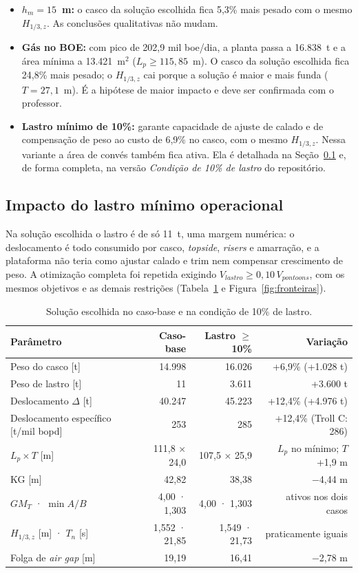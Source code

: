 \documentclass[11pt,a4paper]{article}
\newcommand{\Hz}{H_{1/3,z}}
\begin{document}
\begin{itemize}
\item \textbf{$h_m = 15$~m:} o casco da solução escolhida fica 5,3\% mais pesado com o mesmo
$\Hz$. As conclusões qualitativas não mudam.
\item \textbf{Gás no BOE:} com pico de 202,9 mil boe/dia, a planta passa a 16.838~t e a área
mínima a 13.421~m$^2$ ($L_p \ge 115{,}85$~m). O casco da solução escolhida fica 24,8\% mais
pesado; o $\Hz$ cai porque a solução é maior e mais funda ($T = 27{,}1$~m). É a hipótese de maior
impacto e deve ser confirmada com o professor.
\item \textbf{Lastro mínimo de 10\%:} garante capacidade de ajuste de calado e de compensação
de peso ao custo de 6,9\% no casco, com o mesmo $\Hz$. Nessa variante a área de convés também
fica ativa. Ela é detalhada na Seção~\ref{sec:lastro} e, de forma completa, na versão
\emph{Condição de 10\% de lastro} do repositório.
\end{itemize}

\subsection{Impacto do lastro mínimo operacional}\label{sec:lastro}

Na solução escolhida o lastro é de só 11~t, uma margem numérica: o deslocamento é todo consumido
por casco, \emph{topside}, \emph{risers} e amarração, e a plataforma não teria como ajustar
calado e trim nem compensar crescimento de peso. A otimização completa foi repetida exigindo
$V_{lastro} \ge 0{,}10\,V_{pontoons}$, com os mesmos objetivos e as demais restrições
(Tabela~\ref{tab:lastro} e Figura~\ref{fig:fronteiras}).

\begin{table}[H]
\centering
\caption{Solução escolhida no caso-base e na condição de 10\% de lastro.}\label{tab:lastro}
\small
\begin{tabular}{lrrr}
\toprule
Parâmetro & Caso-base & Lastro $\ge$ 10\% & Variação \\
\midrule
Peso do casco [t] & 14.998 & 16.026 & +6,9\% (+1.028 t) \\
Peso de lastro [t] & 11 & 3.611 & +3.600 t \\
Deslocamento $\Delta$ [t] & 40.247 & 45.223 & +12,4\% (+4.976 t) \\
Deslocamento específico [t/mil bopd] & 253 & 285 & +12,4\% (Troll C: 286) \\
$L_p \times T$ [m] & 111,8 × 24,0 & 107,5 × 25,9 & $L_p$ no mínimo; $T$ +1,9 m \\
KG [m] & 42,82 & 38,38 & $-$4,44 m \\
$GM_T$ · $\min A/B$ & 4,00 · 1,303 & 4,00 · 1,303 & ativos nos dois casos \\
$\Hz$ [m] · $T_n$ [s] & 1,552 · 21,85 & 1,549 · 21,73 & praticamente iguais \\
Folga de \emph{air gap} [m] & 19,19 & 16,41 & $-$2,78 m \\
\bottomrule
\end{tabular}
\end{table}
\end{document}
